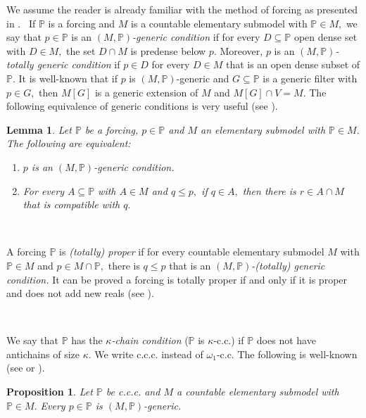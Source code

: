 \documentclass{article}
\newtheorem{lemma}[theorem]{Lemma}
\newtheorem{proposition}[theorem]{Proposition}
\begin{document}
We assume the reader is already familiar with the method of forcing as
presented in \cite{oldKunen}. \ If $\mathbb{P}$ is a forcing and $M$ is a
countable elementary submodel with $\mathbb{P}\in M,$ we say that
$p\in\mathbb{P}$ is an $(M,\mathbb{P})$\emph{-generic condition }if for every
$D\subseteq\mathbb{P}$ open dense set with $D\in M,$ the set $D\cap M$ is
predense below $p.$ Moreover, $p$ is an $(M,\mathbb{P})$\emph{-totally generic
condition }if $p\in D$ for every $D\in M$ that is an open dense subset of
$\mathbb{P}.$ It is well-known that if $p$ is $(M,\mathbb{P})$-generic and
$G\subseteq\mathbb{P}$ is a generic filter with $p\in G,$ then $M\left[
G\right]  $ is a generic extension of $M$ and $M\left[  G\right]  \cap V=M$.
The following equivalence of generic conditions is very useful (see
\cite{NotesonForcingAxioms}).

\begin{lemma}
Let $\mathbb{P}$ be a forcing, $p\in\mathbb{P}$ and $M$ an elementary submodel
with $\mathbb{P}\in M.$ The following are equivalent:
\label{equiv condicion generica}

\begin{enumerate}
\item $p$ is an $(M,\mathbb{P})$-generic condition.

\item For every $A\subseteq\mathbb{P}$ with $A\in M$ and $q\leq p,$ if $q\in
A,$ then there is $r\in A\cap M$ that is compatible with $q.$
\end{enumerate}
\end{lemma}

\qquad\ \ \ \ 

A forcing $\mathbb{P}$ is \emph{(totally) proper }if for every countable
elementary submodel $M$ with $\mathbb{P}\in M$ and $p\in M\cap\mathbb{P},$
there is $q\leq p$ that is an $(M,\mathbb{P})$\emph{-(totally) generic
condition. }It can be proved a forcing is totally proper if and only if it is
proper and does not add new reals (see \cite{IteratedForcingandCH}).

\qquad\ \qquad\ \qquad\ \ \ 

We say that $\mathbb{P}$ has the $\kappa$\emph{-chain condition }($\mathbb{P}$
is $\kappa$\textsf{-c.c.}) if $\mathbb{P}$ does not have antichains of size
$\kappa.$ We write \textsf{c.c.c. }instead of $\omega_{1}$-\textsf{c.c. }The
following is well-known (see \cite{forcingwithoutcombinatorics} or
\cite{NotesonForcingAxioms}).

\begin{proposition}
Let $\mathbb{P}$ be \textsf{c.c.c. }and $M$ a countable elementary submodel
with $\mathbb{P}\in M.$ Every $p\in\mathbb{P}$ is $(M,\mathbb{P})$-generic.
\label{prop ccc gen}
\end{proposition}
\end{document}
